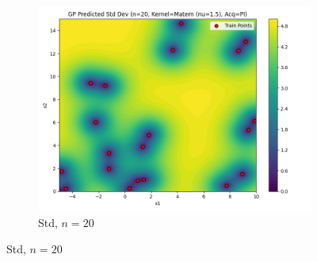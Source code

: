\documentclass[a4paper,12pt]{article}
\begin{document}
\begin{figure}[H]
\begin{subfigure}{0.3\textwidth}
    \includegraphics[width=\linewidth]{Task-02/images/gp_std_matern_n20_PI.png}
    \caption{Std, $n=20$}
\end{subfigure}


\end{figure}
\end{document}
